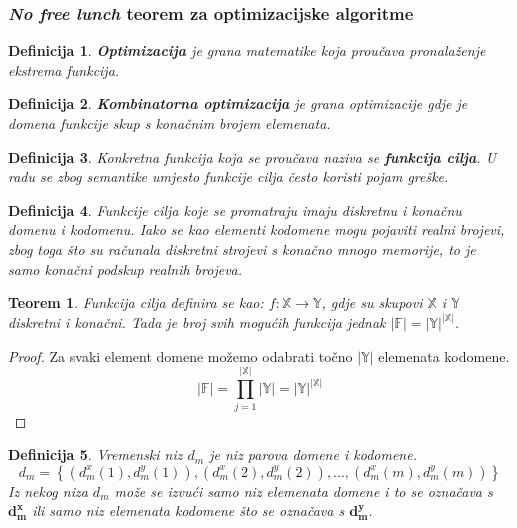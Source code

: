 \documentclass[times, utf8, diplomski, numeric]{fer}
\newtheorem{definition}{Definicija}
\newtheorem{theorem}{Teorem}
\begin{document}
\subsubsection{\emph{No free lunch} teorem za optimizacijske algoritme}

\begin{definition}
\textbf{Optimizacija} je grana matematike koja proučava pronalaženje ekstrema funkcija.
\end{definition}

\begin{definition}
\textbf{Kombinatorna optimizacija} je grana optimizacije gdje je domena funkcije skup s konačnim brojem elemenata.
\end{definition}

\begin{definition}
Konkretna funkcija koja se proučava naziva se \textbf{funkcija cilja}.
U radu se zbog semantike umjesto funkcije cilja često koristi pojam greške.
\end{definition}

\begin{definition}
Funkcije cilja koje se promatraju imaju diskretnu i konačnu domenu i kodomenu. Iako se kao elementi kodomene mogu pojaviti realni brojevi, zbog toga što su računala diskretni strojevi s konačno mnogo memorije, to je samo konačni podskup realnih brojeva.
\end{definition}

\begin{theorem}
Funkcija cilja definira se kao: $f : \mathbb{X} \rightarrow \mathbb{Y}$, gdje su skupovi $\mathbb{X}$ i $\mathbb{Y}$ diskretni i konačni. Tada je broj svih mogućih funkcija jednak $|\mathbb{F}| = |\mathbb{Y}|^{|\mathbb{X}|}$. 
\end{theorem}

\begin{proof}
Za svaki element domene možemo odabrati točno $|\mathbb{Y}|$ elemenata kodomene. 
\begin{equation}
|\mathbb{F}| = \prod_{j=1}^{|\mathbb{X}|} |\mathbb{Y}| =  |\mathbb{Y}|^{|\mathbb{X}|}
\end{equation}
\end{proof}

\begin{definition}
Vremenski niz $d_m$ je niz parova domene i kodomene.
\begin{equation}
d_m = \left \{ (d_m^x(1), d_m^y(1)), (d_m^x(2), d_m^y(2)), ..., (d_m^x(m), d_m^y(m))\right \}
\end{equation} 
Iz nekog niza $d_m$ može se izvući samo niz elemenata domene i to se označava s $\mathbf{d_m^x}$ ili samo niz elemenata kodomene što se označava s $\mathbf{d_m^y}$.
\end{definition}
\end{document}
